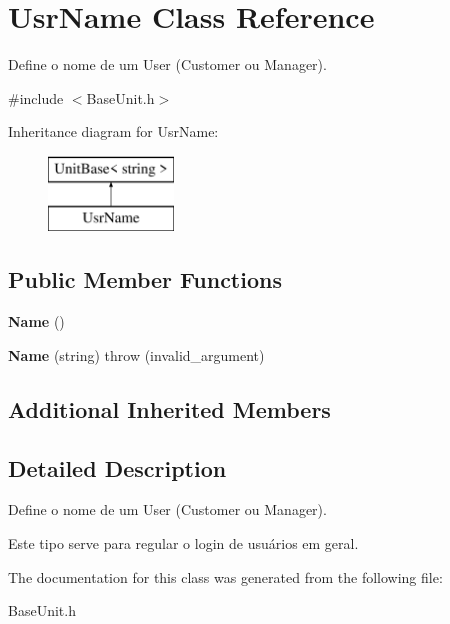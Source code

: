 \hypertarget{classUsrName}{\section{Usr\-Name Class Reference}
\label{classUsrName}
}


Define o nome de um User (Customer ou Manager).  




{\ttfamily \#include $<$Base\-Unit.\-h$>$}

Inheritance diagram for Usr\-Name\-:\begin{figure}[H]
\begin{center}
\leavevmode
\includegraphics[height=2.000000cm]{classUsrName}
\end{center}
\end{figure}
\subsection*{Public Member Functions}
\begin{DoxyCompactItemize}
\item 
\hypertarget{classUsrName_a1b08302bcdce4624efc4283717bf0156}{{\bfseries Name} ()}\label{classUsrName_a1b08302bcdce4624efc4283717bf0156}

\item 
\hypertarget{classUsrName_aa28a3613ce9157f86f56cd038d288df2}{{\bfseries Name} (string)  throw (invalid\-\_\-argument)}\label{classUsrName_aa28a3613ce9157f86f56cd038d288df2}

\end{DoxyCompactItemize}
\subsection*{Additional Inherited Members}


\subsection{Detailed Description}
Define o nome de um User (Customer ou Manager). 

Este tipo serve para regular o login de usuários em geral. 

The documentation for this class was generated from the following file\-:\begin{DoxyCompactItemize}
\item 
Base\-Unit.\-h\end{DoxyCompactItemize}
